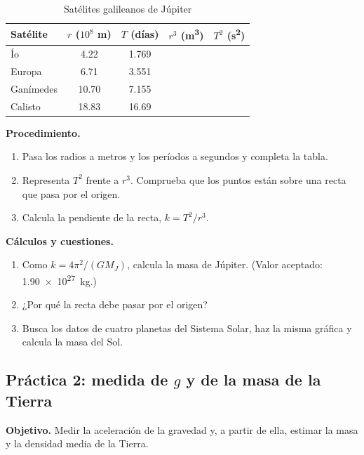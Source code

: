 \begin{table}[H]
    \centering
    \caption{Satélites galileanos de Júpiter}
    \vspace{-5pt}
    \begin{tabular}{@{}lcccc@{}}
        \toprule
        \textbf{Satélite} & \textbf{\(r\) (\(10^8\) \unit{\m})} & \textbf{\(T\) (días)} & \textbf{\(r^3\) (\unit{\m\cubed})} & \textbf{\(T^2\) (\unit{\second\squared})} \\
        \midrule
        Ío & \num{4.22} & \num{1.769} & & \\[3pt]
        Europa & \num{6.71} & \num{3.551} & & \\[3pt]
        Ganímedes & \num{10.70} & \num{7.155} & & \\[3pt]
        Calisto & \num{18.83} & \num{16.69} & & \\
        \bottomrule
    \end{tabular}
    \label{tab:grav-practica-kepler}
\end{table}

\textbf{Procedimiento.}
\begin{enumerate}[label=\numberballmDarkTeal]
    \item Pasa los radios a metros y los períodos a segundos y completa la tabla.
    \item Representa \(T^2\) frente a \(r^3\). Comprueba que los puntos están sobre una recta que pasa por el origen.
    \item Calcula la pendiente de la recta, \(k = T^2/r^3\).
\end{enumerate}

\textbf{Cálculos y cuestiones.}
\begin{enumerate}[label=\letraminuscula]
    \item Como \(k = 4\pi^2/(G M_J)\), calcula la masa de Júpiter. (Valor aceptado: \qty{1.90e27}{\kg}.)
    \item ¿Por qué la recta debe pasar por el origen?
    \item Busca los datos de cuatro planetas del Sistema Solar, haz la misma gráfica y calcula la masa del Sol.
\end{enumerate}

\subsection{Práctica 2: medida de \texorpdfstring{\(g\)}{g} y de la masa de la Tierra}\label{subsec:grav-practica-g}

\textbf{Objetivo.} Medir la aceleración de la gravedad y, a partir de ella, estimar la masa y la densidad media de la Tierra.

